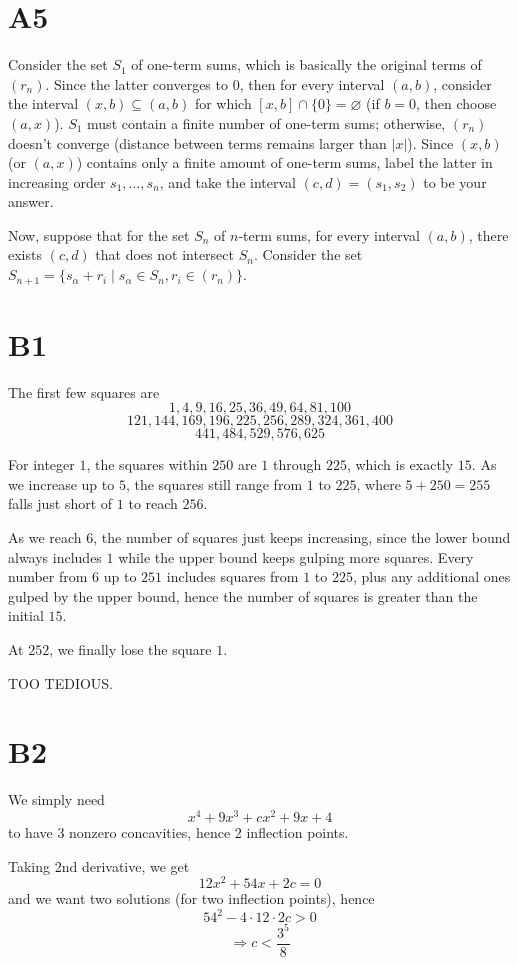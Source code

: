 \documentclass{book}
\begin{document}
\section*{A5}
Consider the set $S_1$ of one-term sums, which is basically the original terms of $(r_n)$. Since the latter converges to $0$, then for every interval $(a, b)$, consider the interval $(x, b) \subseteq (a, b)$ for which $[x, b] \cap \{ 0 \} = \varnothing$ (if $b = 0$, then choose $(a, x)$). $S_1$ must contain a finite number of one-term sums; otherwise, $(r_n)$ doesn't converge (distance between terms remains larger than $|x|$). Since $(x, b)$ (or $(a, x)$) contains only a finite amount of one-term sums, label the latter in increasing order $s_1, \ldots, s_n$, and take the interval $(c, d) = (s_1, s_2)$ to be your answer.

Now, suppose that for the set $S_n$ of $n$-term sums, for every interval $(a, b)$, there exists $(c, d)$ that does not intersect $S_n$. Consider the set $S_{n + 1} = \{ s_\alpha + r_i \mid s_\alpha \in S_n, r_i \in (r_n) \}$.

\section*{B1}
The first few squares are
$$1, 4, 9, 16, 25, 36, 49, 64, 81, 100$$
$$121, 144, 169, 196, 225, 256, 289, 324, 361, 400$$
$$441, 484, 529, 576, 625$$

For integer $1$, the squares within $250$ are $1$ through $225$, which is exactly $15$. As we increase up to $5$, the squares still range from $1$ to $225$, where $5 + 250 = 255$ falls just short of $1$ to reach $256$.

As we reach $6$, the number of squares just keeps increasing, since the lower bound always includes $1$ while the upper bound keeps gulping more squares. Every number from $6$ up to $251$ includes squares from $1$ to $225$, plus any additional ones gulped by the upper bound, hence the number of squares is greater than the initial $15$.

At $252$, we finally lose the square $1$.

TOO TEDIOUS.

\section*{B2}
We simply need
$$x^4 + 9x^3 + cx^2 + 9x + 4$$
to have 3 nonzero concavities, hence 2 inflection points.

Taking 2nd derivative, we get
$$12x^2 + 54x + 2c = 0$$
and we want two solutions (for two inflection points), hence
$$54^2 - 4 \cdot 12 \cdot 2c > 0$$
$$\Rightarrow c < \frac{3^5}{8}$$
\end{document}
